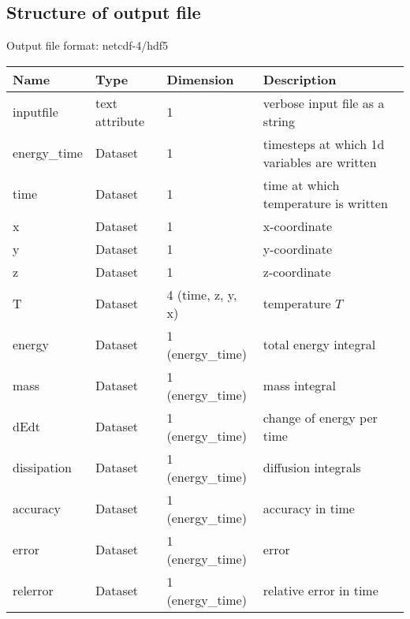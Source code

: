 \subsection{Structure of output file}
Output file format: netcdf-4/hdf5
%
\begin{longtable}{lll>{\RaggedRight}p{7cm}}
\toprule
\rowcolor{gray!50}\textbf{Name} &  \textbf{Type} & \textbf{Dimension} & \textbf{Description}  \\ \midrule
inputfile  &     text attribute & 1 & verbose input file as a string \\
energy\_time     & Dataset & 1 & timesteps at which 1d variables are written \\
time             & Dataset & 1 & time at which temperature is written \\
x                & Dataset & 1 & x-coordinate  \\
y                & Dataset & 1 & y-coordinate \\
z                & Dataset & 1 & z-coordinate \\
T                & Dataset & 4 (time, z, y, x) & temperature $T$ \\
energy           & Dataset & 1 (energy\_time) & total energy integral  \\
mass             & Dataset & 1 (energy\_time) & mass integral   \\
dEdt             & Dataset & 1 (energy\_time) & change of energy per time  \\
dissipation      & Dataset & 1 (energy\_time) & diffusion integrals  \\
accuracy         & Dataset & 1 (energy\_time) & accuracy in time  \\
error            & Dataset & 1 (energy\_time) & error \\
relerror         & Dataset & 1 (energy\_time) & relative error in time \\
\bottomrule
\end{longtable}





